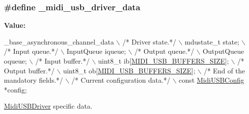 \subsubsection[{\texorpdfstring{\+\_\+midi\+\_\+usb\+\_\+driver\+\_\+data}{_midi_usb_driver_data}}]{\setlength{\rightskip}{0pt plus 5cm}\#define \+\_\+midi\+\_\+usb\+\_\+driver\+\_\+data}\hypertarget{group__MIDI__USB_ga8cfb956039dff17bc67f80137c28bcbb}{}\label{group__MIDI__USB_ga8cfb956039dff17bc67f80137c28bcbb}
{\bfseries Value\+:}
\begin{DoxyCode}
\_base\_asynchronous\_channel\_data                                           \(\backslash\)
  \textcolor{comment}{/* Driver state.*/}                                                        \(\backslash\)
  mdustate\_t                state;                                          \(\backslash\)
  \textcolor{comment}{/* Input queue.*/}                                                         \(\backslash\)
  InputQueue                iqueue;                                         \(\backslash\)
  \textcolor{comment}{/* Output queue.*/}                                                        \(\backslash\)
  OutputQueue               oqueue;                                         \(\backslash\)
  \textcolor{comment}{/* Input buffer.*/}                                                        \(\backslash\)
  uint8\_t                   ib[\hyperlink{group__MIDI__USB_ga76b9bd9d7068efe165b409fad9c63fc5}{MIDI\_USB\_BUFFERS\_SIZE}];                    \(\backslash\)
  \textcolor{comment}{/* Output buffer.*/}                                                       \(\backslash\)
  uint8\_t                   ob[\hyperlink{group__MIDI__USB_ga76b9bd9d7068efe165b409fad9c63fc5}{MIDI\_USB\_BUFFERS\_SIZE}];                    \(\backslash\)
  \textcolor{comment}{/* End of the mandatory fields.*/}                                         \(\backslash\)
  \textcolor{comment}{/* Current configuration data.*/}                                          \(\backslash\)
  const \hyperlink{structMidiUSBConfig}{MidiUSBConfig}     *config;
\end{DoxyCode}


{\ttfamily \hyperlink{structMidiUSBDriver}{Midi\+U\+S\+B\+Driver}} specific data. 

